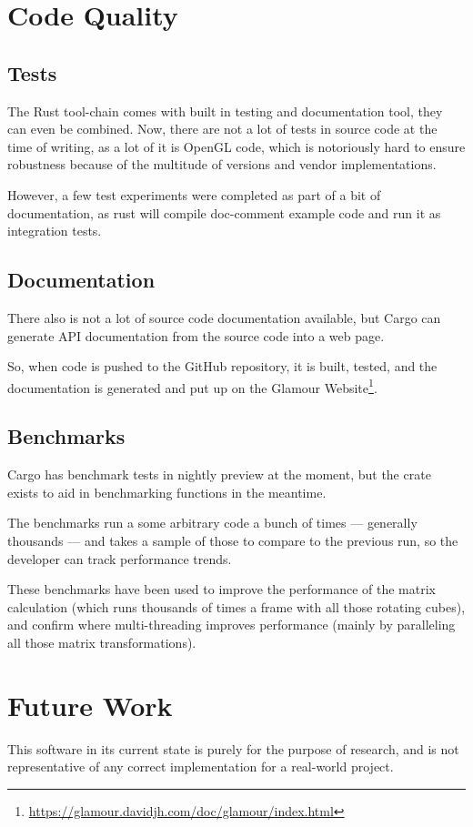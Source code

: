 \section{Code Quality}

\subsection{Tests}
The Rust tool-chain comes with built in testing and documentation tool, they can even be combined.
Now, there are not a lot of tests in source code at the time of writing, as a lot of it is OpenGL code, which is notoriously hard to ensure robustness because of the multitude of versions and vendor implementations.

However, a few test experiments were completed as part of a bit of documentation, as rust will compile doc-comment example code and run it as integration tests.

\subsection{Documentation}
There also is not a lot of source code documentation available, but Cargo can generate API documentation from the source code into a web page.

So, when code is pushed to the GitHub repository, it is built, tested, and the documentation is generated and put up on the Glamour Website\footnote{\url{https://glamour.davidjh.com/doc/glamour/index.html}}.

\subsection{Benchmarks}
Cargo has benchmark tests in nightly preview at the moment, but the  crate exists to aid in benchmarking functions in the meantime.

The benchmarks run a some arbitrary code a bunch of times — generally thousands — and takes a sample of those to compare to the previous run, so the developer can track performance trends.

These benchmarks have been used to improve the performance of the  matrix calculation (which runs thousands of times a frame with all those rotating cubes), and confirm where multi-threading improves performance (mainly by paralleling all those matrix transformations).

\section{Future Work}
This software in its current state is purely for the purpose of research, and is not representative of any correct implementation for a real-world project.

